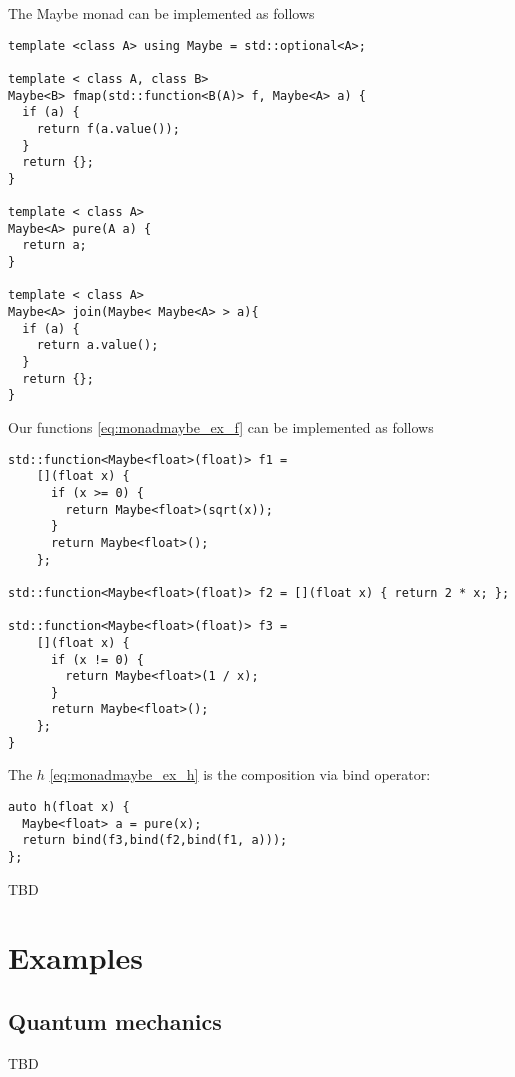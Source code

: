 \begin{example}
\label{ex:maybe_monad_cpp}
The Maybe monad can be implemented as follows
\begin{verbatim}
template <class A> using Maybe = std::optional<A>;

template < class A, class B> 
Maybe<B> fmap(std::function<B(A)> f, Maybe<A> a) {
  if (a) {
    return f(a.value());
  }
  return {};
}

template < class A> 
Maybe<A> pure(A a) {
  return a;
}

template < class A> 
Maybe<A> join(Maybe< Maybe<A> > a){
  if (a) {
    return a.value();
  }
  return {};
}
\end{verbatim} 

Our functions \eqref{eq:monadmaybe_ex_f} can be implemented as follows
\begin{verbatim}
std::function<Maybe<float>(float)> f1 =
    [](float x) {
      if (x >= 0) {
        return Maybe<float>(sqrt(x));
      }
      return Maybe<float>();
    };

std::function<Maybe<float>(float)> f2 = [](float x) { return 2 * x; };

std::function<Maybe<float>(float)> f3 =
    [](float x) {
      if (x != 0) {
        return Maybe<float>(1 / x);
      }
      return Maybe<float>();
    };
}
\end{verbatim}

The $h$ \eqref{eq:monadmaybe_ex_h} is the composition via bind
operator:
\begin{verbatim}
auto h(float x) {
  Maybe<float> a = pure(x);
  return bind(f3,bind(f2,bind(f1, a)));
};
\end{verbatim}

\end{example}


TBD

\section{Examples}

\subsection{Quantum mechanics}

\begin{definition}
  \label{def:tensor_product}
  TBD
\end{definition}

